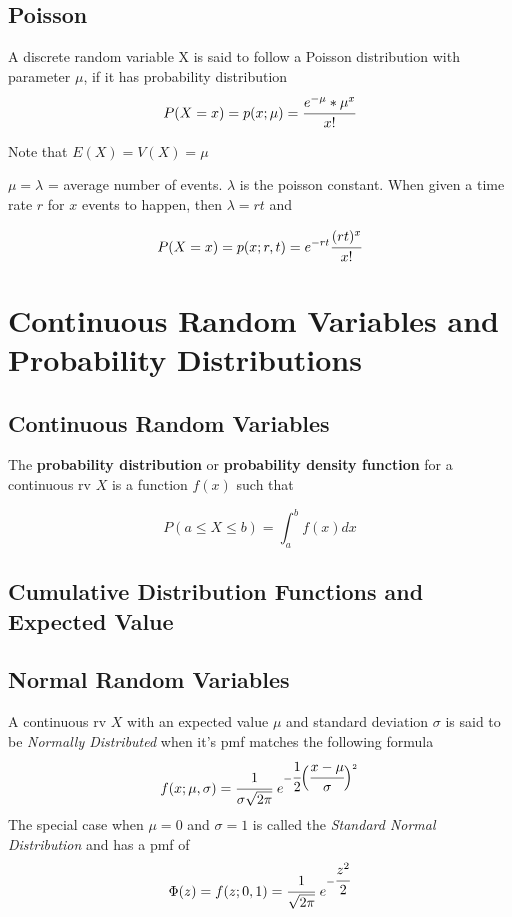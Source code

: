 \documentclass[10pt,twoside,a4paper]{article}
\begin{document}
\begin{multicols*}{2}
\begin{flushleft}
	\subsection{Poisson}
	A discrete random variable X is said to follow a Poisson distribution
	with parameter $\mu$, if it has probability distribution 
	$$ P(X = x) = p(x; \mu) = \cfrac{e^{-\mu}*\mu^x}{x!} $$

	Note that $E(X) = V(X) = \mu$

	$\mu = \lambda$ = average number of events. $\lambda$ is the poisson constant.
	When given a time rate $r$ for $x$ events to happen, then $\lambda = rt$ and

	$$ P(X = x) = p(x; r,t) = e^{-rt}\cfrac{(rt)^x}{x!} $$


	\section{Continuous Random Variables and Probability Distributions}

	\subsection{Continuous Random Variables}
	The \textbf{probability distribution} or \textbf{probability density function}
	for a continuous rv $X$ is a function $f(x)$ such that

	$$P(a \leq X \leq b) = \int_{a}^{b} f(x) dx$$

	\subsection{Cumulative Distribution Functions and Expected Value}
	\subsection{Normal Random Variables}
	A continuous rv $X$ with an expected value $\mu$ and standard deviation $\sigma$
	is said to be \textit{Normally Distributed} when it's pmf matches the following
	formula
	$$f(x; \mu, \sigma) = \cfrac{1}{\sigma\sqrt{2\pi}}~e^{-\cfrac{1}{2}\Big(\cfrac{x - \mu}{\sigma}\Big)^2}$$
	The special case when $\mu = 0$ and $\sigma = 1$ is called the
	\textit{Standard Normal Distribution} and has a pmf of 
	$$ \Phi(z) = f(z; 0, 1) = \cfrac{1}{\sqrt{2\pi}}~e^{-\cfrac{z^2}{2}} $$


\end{flushleft}
\end{multicols*}
\end{document}
